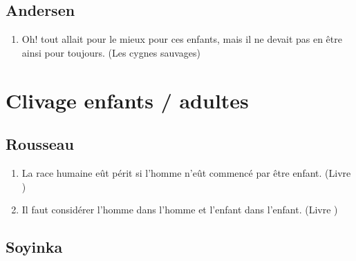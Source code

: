 \documentclass[a4paper, 11pt, hidelinks]{article}
\newcommand{\rb}[1]{\Romanbar{#1}}
\begin{document}
\subsection{Andersen}


\begin{enumerate}
    \item Oh! tout allait pour le mieux pour ces enfants, mais il ne devait pas en être ainsi pour toujours. (Les cygnes sauvages)
\end{enumerate}












































\section{Clivage enfants / adultes}



\subsection{Rousseau}


\begin{enumerate}
    \item La race humaine eût périt si l'homme n'eût commencé par être enfant. (Livre \rb{1})
    \item Il faut considérer l'homme dans l'homme et l'enfant dans l'enfant. (Livre \rb{2})
\end{enumerate}



\subsection{Soyinka}
\end{document}
